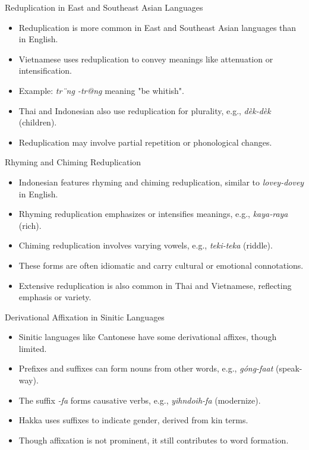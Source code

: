 \documentclass{beamer}
\begin{document}
\begin{frame}{Reduplication in East and Southeast Asian Languages}
    \begin{itemize}
        \item Reduplication is more common in East and Southeast Asian languages than in English.
        \item Vietnamese uses reduplication to convey meanings like attenuation or intensification.
        \item Example: \textit{tr¨ng -tr@ng} meaning "be whitish".
        \item Thai and Indonesian also use reduplication for plurality, e.g., \textit{dèk-dèk} (children).
        \item Reduplication may involve partial repetition or phonological changes.
    \end{itemize}
\end{frame}

\begin{frame}{Rhyming and Chiming Reduplication}
    \begin{itemize}
        \item Indonesian features rhyming and chiming reduplication, similar to \textit{lovey-dovey} in English.
        \item Rhyming reduplication emphasizes or intensifies meanings, e.g., \textit{kaya-raya} (rich).
        \item Chiming reduplication involves varying vowels, e.g., \textit{teki-teka} (riddle).
        \item These forms are often idiomatic and carry cultural or emotional connotations.
        \item Extensive reduplication is also common in Thai and Vietnamese, reflecting emphasis or variety.
    \end{itemize}
\end{frame}

\begin{frame}{Derivational Affixation in Sinitic Languages}
    \begin{itemize}
        \item Sinitic languages like Cantonese have some derivational affixes, though limited.
        \item Prefixes and suffixes can form nouns from other words, e.g., \textit{góng-faat} (speak-way).
        \item The suffix \textit{-fa} forms causative verbs, e.g., \textit{yihndoih-fa} (modernize).
        \item Hakka uses suffixes to indicate gender, derived from kin terms.
        \item Though affixation is not prominent, it still contributes to word formation.
    \end{itemize}
\end{frame}
\end{document}
